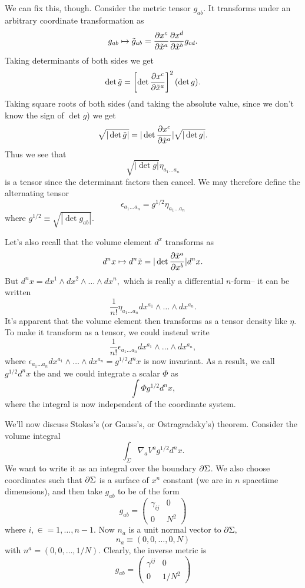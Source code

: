 We can fix this, though. Consider the metric tensor $g_{ab}$. It transforms under an arbitrary coordinate transformation as
$$g_{ab}\mapsto \tilde g_{ab}=\frac{\partial x^c}{\partial \tilde x^a}\frac{\partial x^d}{\partial\tilde x^b}g_{cd}.$$
Taking determinants of both sides we get
$$\det \tilde g = \left[\det \frac{\partial x^c}{\partial \tilde x^a}\right]^2 (\det g).$$
Taking square roots of both sides (and taking the absolute value, since we don't know the sign of $\det g$) we get
$$\sqrt{|\det \tilde g|}=|\det \frac{\partial x^c}{\partial \tilde x^a}|\sqrt{|\det g|}.$$
Thus we see that
$$\sqrt{|\det g|}\eta_{a_1\ldots a_n}$$ is a tensor since the determinant factors then cancel. We may therefore define the alternating tensor
$$\epsilon_{a_1\ldots a_n}=g^{1/2}\eta_{a_1\ldots a_n}$$ where $g^{1/2}\equiv\sqrt{|\det g_{ab}|}.$

Let's also recall that the volume element $d^x$ transforms as
$$d^nx\mapsto d^n \tilde x =|\det \frac{\partial \tilde x^a}{\partial x^b}|d^n x.$$
But $d^nx=dx^1 \wedge dx^2 \wedge \ldots \wedge dx^n,$ which is really a differential $n$-form-- it can be written
$$\frac{1}{n!}\eta_{a_1\ldots a_n}dx^{a_1}\wedge \ldots \wedge dx^{a_n}.$$
It's apparent that the volume element then transforms as a tensor density like $\eta$. To make it transform as a tensor, we could instead write
$$\frac{1}{n!}\epsilon_{a_1\ldots a_n} dx^{a_1}\wedge \ldots \wedge dx^{a_n},$$
where $\epsilon_{a_1\ldots a_n} dx^{a_1}\wedge \ldots \wedge dx^{a_n}=g^{1/2}d^nx$ is now invariant. As a result, we call $g^{1/2}d^n x$ the  and we could integrate a scalar $\Phi$ as
$$\int \Phi g^{1/2} d^n x,$$
where the integral is now independent of the coordinate system.

We'll now discuss Stokes's (or Gauss's, or Ostragradsky's) theorem. Consider the volume integral
$$\int_{\Sigma}\nabla_a V^a g^{1/2}d^n x.$$
We want to write it as an integral over the boundary $\partial \Sigma$. We also choose coordinates such that $\partial\Sigma$ is a surface of $x^n$ constant (we are in $n$ spacetime dimensions), and then take $g_{ab}$ to be of the form
$$g_{ab}=\begin{pmatrix}
\gamma_{ij}&0\\
0&N^2
\end{pmatrix}$$
where $i,\in=1,\ldots,n-1.$
Now $n_a$ is a unit normal vector to $\partial\Sigma,$
$$n_a\equiv (0,0,\ldots, 0,N)$$ with $n^a=(0,0,\ldots,1/N)$. Clearly, the inverse metric is
$$g_{ab}=\begin{pmatrix}
\gamma^{ij}&0\\
0&1/N^2
\end{pmatrix}$$

